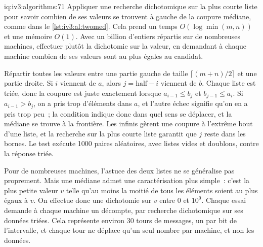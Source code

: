 \begin{solution}{iq:iv3:algorithms:71}
Appliquer une recherche dichotomique sur la plus courte liste pour savoir combien de ses valeurs se trouvent à gauche de la coupure médiane, comme dans le \cref{lst:iv3:al:twomed}. Cela prend un temps $O(\log \min(m, n))$ et une mémoire $O(1)$. Avec un billion d'entiers répartis sur de nombreuses machines, effectuer plutôt la dichotomie sur la valeur, en demandant à chaque machine combien de ses valeurs sont au plus égales au candidat.
\label{lst:iv3:al:twomed}

Répartir toutes les valeurs entre une partie gauche de taille $\lceil (m + n)/2 \rceil$ et une partie droite. Si $i$ viennent de $a$, alors $j = \text{half} - i$ viennent de $b$. Chaque liste est triée, donc la coupure est juste exactement lorsque $a_{i-1} \le b_j$ et $b_{j-1} \le a_i$. Si $a_{i-1} > b_j$, on a pris trop d'éléments dans $a$, et l'autre échec signifie qu'on en a pris trop peu~; la condition indique donc dans quel sens se déplacer, et la médiane se trouve à la frontière. Les infinis gèrent une coupure à l'extrême bout d'une liste, et la recherche sur la plus courte liste garantit que $j$ reste dans les bornes. Le test exécute 1000 paires aléatoires, avec listes vides et doublons, contre la réponse triée.

Pour de nombreuses machines, l'astuce des deux listes ne se généralise pas proprement. Mais une médiane admet une caractérisation plus simple~: c'est la plus petite valeur $v$ telle qu'au moins la moitié de tous les éléments soient au plus égaux à $v$. On effectue donc une dichotomie sur $v$ entre 0 et $10^9$. Chaque essai demande à chaque machine un décompte, par recherche dichotomique sur ses données triées. Cela représente environ 30 tours de messages, un par bit de l'intervalle, et chaque tour ne déplace qu'un seul nombre par machine, et non les données.

\end{solution}

